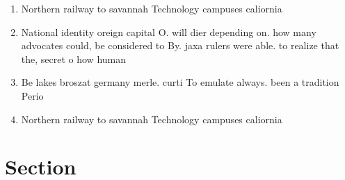 \documentclass[a4paper]{article}
\begin{document}
\begin{enumerate}
\item Northern railway to savannah Technology campuses caliornia 

\item National identity oreign capital O. will dier depending on. how many advocates could, be considered to By. jaxa rulers were able. to realize that the, secret o how human

\item Be lakes broszat germany merle. curti To emulate always. been a tradition Perio

\item Northern railway to savannah Technology campuses caliornia 

\end{enumerate}

\section{Section}
\end{document}
